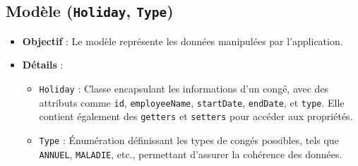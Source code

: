\documentclass[a4paper,12pt]{article}
\begin{document}
\subsection{Modèle (\texttt{Holiday}, \texttt{Type})}

\begin{itemize} \item \textbf{Objectif} : Le modèle représente les données manipulées par l'application. \item \textbf{Détails} : \begin{itemize} \item \texttt{Holiday} : Classe encapsulant les informations d'un congé, avec des attributs comme \texttt{id}, \texttt{employeeName}, \texttt{startDate}, \texttt{endDate}, et \texttt{type}. Elle contient également des \texttt{getters} et \texttt{setters} pour accéder aux propriétés. \item \texttt{Type} : Énumération définissant les types de congés possibles, tels que \texttt{ANNUEL}, \texttt{MALADIE}, etc., permettant d'assurer la cohérence des données. \end{itemize} \end{itemize}
\end{document}
